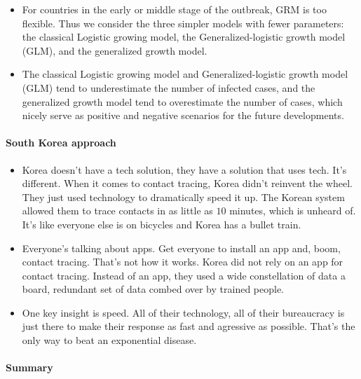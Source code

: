 \begin{itemize}
    \item For countries in the early or middle stage of the outbreak, GRM is too
        flexible. Thus we consider the three simpler models with fewer parameters:
        the classical Logistic growing model, the Generalized-logistic growth model
        (GLM), and the generalized growth model.
    \item The classical Logistic growing model and Generalized-logistic growth
        model (GLM) tend to underestimate the number of infected cases, and the
        generalized growth model tend to overestimate the number of cases, which
        nicely serve as positive and negative scenarios for the future developments.
\end{itemize}

\paragraph{South Korea approach}

\begin{itemize}
    \item Korea doesn't have a tech solution, they have a solution that uses tech.
        It's different. When it comes to contact tracing, Korea didn't reinvent the
        wheel. They just used technology to dramatically speed it up. The Korean
        system allowed them to trace contacts in as little as $10$ minutes, which
        is unheard of. It's like everyone else is on bicycles and Korea has a bullet
        train.
    \item Everyone's talking about apps. Get everyone to install an app and, boom,
        contact tracing. That's not how it works. Korea did not rely on an app for
        contact tracing. Instead of an app, they used a wide constellation of data
        a board, redundant set of data combed over by trained people.
    \item One key insight is speed. All of their technology, all of their
        bureaucracy is just there to make their response as fast and agressive
        as possible. That's the only way to beat an exponential disease.
\end{itemize}


\paragraph{Summary}

